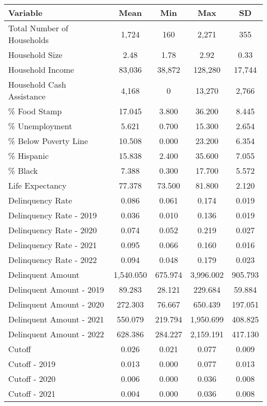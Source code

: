 \begin{tabular}{l|c|c|c|c}
\toprule 
\midrule 
Variable & Mean & Min & Max & SD \\
\midrule 
Total Number of Households & 1,724 & 160 & 2,271 & 355 \\
\quad Household Size & 2.48 & 1.78 & 2.92 & 0.33 \\
Household Income & 83,036 & 38,872 & 128,280 & 17,744 \\
\quad Household Cash Assistance & 4,168 & 0 & 13,270 & 2,766 \\
\% Food Stamp & 17.045 & 3.800 & 36.200 & 8.445 \\
\% Unemployment & 5.621 & 0.700 & 15.300 & 2.654 \\
\% Below Poverty Line & 10.508 & 0.000 & 23.200 & 6.354 \\
\% Hispanic & 15.838 & 2.400 & 35.600 & 7.055 \\
\% Black & 7.388 & 0.300 & 17.700 & 5.572 \\
Life Expectancy & 77.378 & 73.500 & 81.800 & 2.120 \\
\midrule 
Delinquency Rate & 0.086 & 0.061 & 0.174 & 0.019 \\
\quad Delinquency Rate - 2019 & 0.036 & 0.010 & 0.136 & 0.019 \\
\quad Delinquency Rate - 2020 & 0.074 & 0.052 & 0.219 & 0.027 \\
\quad Delinquency Rate - 2021 & 0.095 & 0.066 & 0.160 & 0.016 \\
\quad Delinquency Rate - 2022 & 0.094 & 0.048 & 0.179 & 0.023 \\
\midrule 
Delinquent Amount & 1,540.050 & 675.974 & 3,996.002 & 905.793 \\
\quad Delinquent Amount - 2019 & 89.283 & 28.121 & 229.684 & 59.884 \\
\quad Delinquent Amount - 2020 & 272.303 & 76.667 & 650.439 & 197.051 \\
\quad Delinquent Amount - 2021 & 550.079 & 219.794 & 1,950.699 & 408.825 \\
\quad Delinquent Amount - 2022 & 628.386 & 284.227 & 2,159.191 & 417.130 \\
\midrule 
Cutoff & 0.026 & 0.021 & 0.077 & 0.009 \\
\quad Cutoff - 2019 & 0.013 & 0.000 & 0.077 & 0.013 \\
\quad Cutoff - 2020 & 0.006 & 0.000 & 0.036 & 0.008 \\
\quad Cutoff - 2021 & 0.004 & 0.000 & 0.036 & 0.008 \\

\end{tabular}
